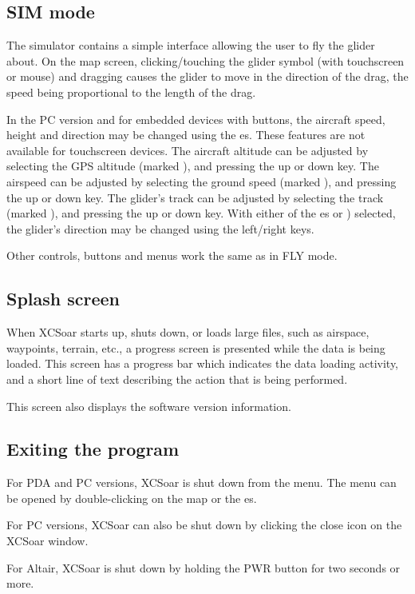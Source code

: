 \subsection*{SIM mode}
The simulator contains a simple interface allowing the user to fly
the glider about.  On the map screen, clicking/touching the glider symbol
(with touchscreen or mouse) and dragging 
causes the glider to move in the direction of the drag, the
speed being proportional to the length of the drag.  

In the PC version and for embedded devices with buttons, the aircraft
speed, height and direction may be changed using the \InfoBox es.
These features are not available for touchscreen devices.
The aircraft altitude can be adjusted by selecting the GPS altitude
{\InfoBox} (marked ), and pressing the up or down key.
The airspeed  can be adjusted by selecting the ground speed
{\InfoBox} (marked ), and pressing the up or down key.
The glider's track  can be adjusted by selecting the track
{\InfoBox} (marked ), and pressing the up or down key.
With either of the \InfoBox es  or )
selected, the glider's direction may be changed using the left/right keys.

Other controls, buttons and menus work the same as in FLY mode.


\subsection*{Splash screen}
When XCSoar starts up, shuts down, or loads large files, such as airspace,
waypoints, terrain, etc., a progress screen is presented while the data is being
loaded. This screen has a progress bar which indicates the data loading
activity, and a short line of text describing the action that is being performed.

This screen also displays the software version information.

\subsection*{Exiting the program}
For PDA and PC versions, XCSoar is shut down from the menu. The menu can be
opened by double-clicking on the map or the \InfoBox es.
\begin{quote}
\end{quote}

For PC versions, XCSoar can also be shut down by clicking the close icon
on the XCSoar window.

For Altair, XCSoar is shut down by holding the PWR button for two seconds or
more.

